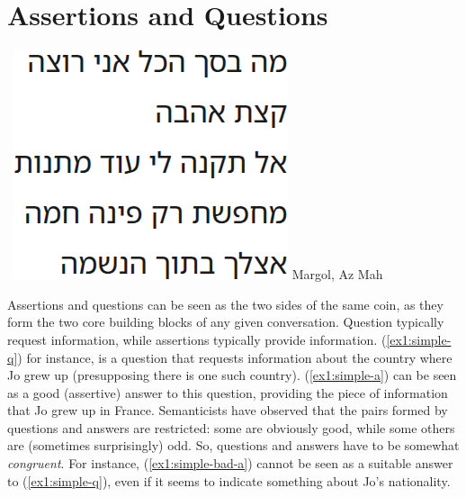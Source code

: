 \chapter{Assertions and Questions}\label{chap:introduction}

\begin{flushright}
	~\hfill \includegraphics[width=.18\linewidth]{./images/margol.png}\newline\vspace{5mm}
	Margol, Az Mah
\end{flushright}


Assertions and questions can be seen as the two sides of the same coin, as they form the two core building blocks of any given conversation. Question typically request information, while assertions typically provide information. (\ref{ex1:simple-q}) for instance, is a question that requests information about the country where Jo grew up (presupposing there is one such country). (\ref{ex1:simple-a}) can be seen as a good (assertive) answer to this question, providing the piece of information that Jo grew up in France. Semanticists have observed that the pairs formed by questions and answers are restricted: some are obviously good, while some others are (sometimes surprisingly) odd. So, questions and answers have to be somewhat \textit{congruent}. For instance, (\ref{ex1:simple-bad-a}) cannot be seen as a suitable answer to (\ref{ex1:simple-q}), even if it seems to indicate something about Jo's nationality.

\begin{exe}
	\ex\label{ex1:simple-q-a}
	\begin{xlist}
		\label{ex1:simple-q}
		\label{ex1:simple-a}
		\label{ex1:simple-bad-a}
	\end{xlist}
\end{exe}

